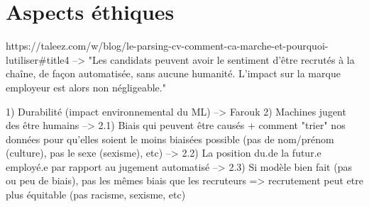 \section{Aspects éthiques}\label{section:aspects_ethiques}




https://taleez.com/w/blog/le-parsing-cv-comment-ca-marche-et-pourquoi-lutiliser#title4
--> "Les candidats peuvent avoir le sentiment d’être recrutés à la chaîne, de façon automatisée, sans aucune humanité. L’impact sur la marque employeur est alors non négligeable."


1) Durabilité (impact environnemental du ML) --> Farouk
2) Machines jugent des être humains 
--> 2.1) Biais qui peuvent être causés + comment "trier" nos données pour qu'elles soient le moins biaisées possible (pas de nom/prénom (culture), pas le sexe (sexisme), etc)
--> 2.2) La position du.de la futur.e employé.e par rapport au jugement automatisé
--> 2.3) Si modèle bien fait (pas ou peu de biais), pas les mêmes biais que les recruteurs => recrutement peut etre plus équitable (pas racisme, sexisme, etc)



